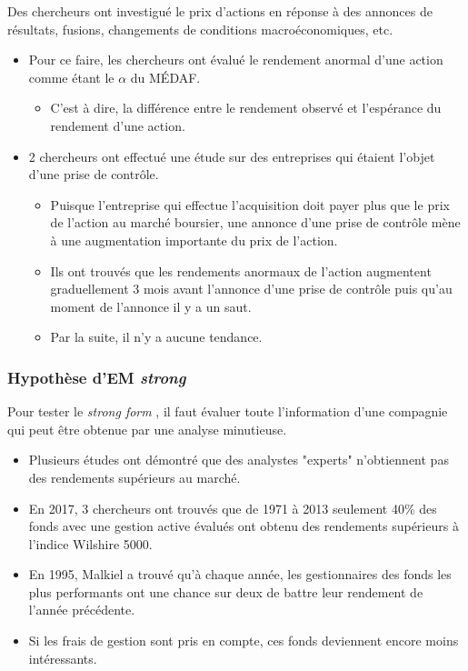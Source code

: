 \documentclass[10pt, french]{article}
\begin{document}
\begin{multicols*}{2}
Des chercheurs ont investigué le prix d'actions en réponse à des annonces de résultats, fusions, changements de conditions macroéconomiques, etc.
\begin{itemize}
	\item	Pour ce faire, les chercheurs ont évalué le rendement anormal d'une action comme étant le $\alpha$ du MÉDAF.
		\begin{itemize}
		\item	C'est à dire, la différence entre le rendement observé et l'espérance du rendement d'une action.
		\end{itemize}
	\item	2 chercheurs ont effectué une étude sur des entreprises qui étaient l'objet d'une prise de contrôle.
		\begin{itemize}
		\item	Puisque l'entreprise qui effectue l'acquisition doit payer plus que le prix de l'action au marché boursier, une annonce d'une prise de contrôle mène à une augmentation importante du prix de l'action.
		\item	Ils ont trouvés que les rendements anormaux de l'action augmentent graduellement 3 mois avant l'annonce d'une prise de contrôle puis qu'au moment de l'annonce il y a un saut.
		\item	Par la suite, il n'y a aucune tendance.
		\end{itemize}
\end{itemize}


\subsubsection{Hypothèse d'EM \og \textit{strong} \fg{}}
Pour tester le \og \textit{strong form} \fg{}, il faut évaluer toute l'information d'une compagnie qui peut être obtenue par une analyse minutieuse.
\begin{itemize}
	\item	Plusieurs études ont démontré que des analystes "experts" n'obtiennent pas des rendements supérieurs au marché.
	\item	En 2017, 3 chercheurs ont trouvés que de 1971 à 2013 seulement 40\% des fonds avec une gestion active évalués ont obtenu des rendements supérieurs à l'indice Wilshire 5000.
	\item	En 1995, Malkiel a trouvé qu'à chaque année, les gestionnaires des fonds les plus performants ont une chance sur deux de battre leur rendement de l'année précédente.
	\item	Si les frais de gestion sont pris en compte, ces fonds deviennent encore moins intéressants.
\end{itemize}



\end{multicols*}
\end{document}
